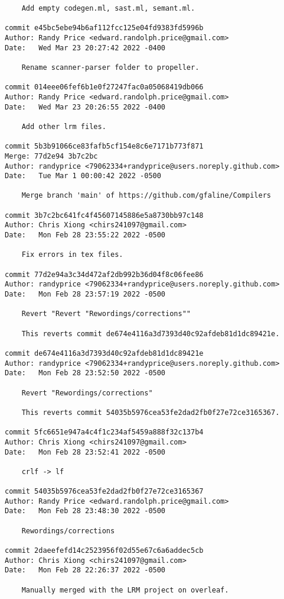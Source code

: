 {\begin{verbatim}
    Add empty codegen.ml, sast.ml, semant.ml.

commit e45bc5ebe94b6af112fcc125e04fd9383fd5996b
Author: Randy Price <edward.randolph.price@gmail.com>
Date:   Wed Mar 23 20:27:42 2022 -0400

    Rename scanner-parser folder to propeller.

commit 014eee06fef6b1e0f27247fac0a05068419db066
Author: Randy Price <edward.randolph.price@gmail.com>
Date:   Wed Mar 23 20:26:55 2022 -0400

    Add other lrm files.

commit 5b3b91066ce83fafb5cf154e8c6e7171b773f871
Merge: 77d2e94 3b7c2bc
Author: randyprice <79062334+randyprice@users.noreply.github.com>
Date:   Tue Mar 1 00:00:42 2022 -0500

    Merge branch 'main' of https://github.com/gfaline/Compilers

commit 3b7c2bc641fc4f45607145886e5a8730bb97c148
Author: Chris Xiong <chirs241097@gmail.com>
Date:   Mon Feb 28 23:55:22 2022 -0500

    Fix errors in tex files.

commit 77d2e94a3c34d472af2db992b36d04f8c06fee86
Author: randyprice <79062334+randyprice@users.noreply.github.com>
Date:   Mon Feb 28 23:57:19 2022 -0500

    Revert "Revert "Rewordings/corrections""
    
    This reverts commit de674e4116a3d7393d40c92afdeb81d1dc89421e.

commit de674e4116a3d7393d40c92afdeb81d1dc89421e
Author: randyprice <79062334+randyprice@users.noreply.github.com>
Date:   Mon Feb 28 23:52:50 2022 -0500

    Revert "Rewordings/corrections"
    
    This reverts commit 54035b5976cea53fe2dad2fb0f27e72ce3165367.

commit 5fc6651e947a4c4f1c234af5459a888f32c137b4
Author: Chris Xiong <chirs241097@gmail.com>
Date:   Mon Feb 28 23:52:41 2022 -0500

    crlf -> lf

commit 54035b5976cea53fe2dad2fb0f27e72ce3165367
Author: Randy Price <edward.randolph.price@gmail.com>
Date:   Mon Feb 28 23:48:30 2022 -0500

    Rewordings/corrections

commit 2daeefefd14c2523956f02d55e67c6a6addec5cb
Author: Chris Xiong <chirs241097@gmail.com>
Date:   Mon Feb 28 22:26:37 2022 -0500

    Manually merged with the LRM project on overleaf.


\end{verbatim}}
